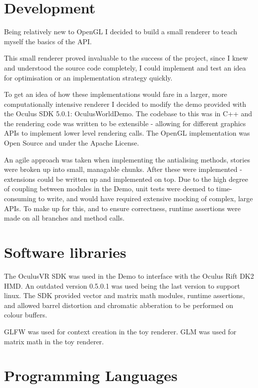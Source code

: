 \documentclass[12pt,a4paper,twoside,openright]{report}
\begin{document}
\section{Development}

Being relatively new to OpenGL I decided to build a small renderer to teach myself the basics of the API.

This small renderer proved invaluable to the success of the project, since I knew and understood the source code completely, I could implement and test an idea for optimisation or an implementation strategy quickly.

To get an idea of how these implementations would fare in a larger, more computationally intensive renderer I decided to modify the demo provided with the Oculus SDK 5.0.1: OculusWorldDemo.
The codebase to this was in C++ and the rendering code was written to be extensible - allowing for different graphics APIs to implement lower level rendering calls. The OpenGL implementation was Open Source and under the Apache License.

An agile approach was taken when implementing the antialising methods, stories were broken up into small, managable chunks. After these were implemented - extensions could be written up and implemented on top.
Due to the high degree of coupling between modules in the Demo, unit tests were deemed to time-consuming to write, and would have required extensive mocking of complex, large APIs.
To make up for this, and to ensure correctness, runtime assertions were made on all branches and method calls.

\section{Software libraries}

The OculusVR SDK was used in the Demo to interface with the Oculus Rift DK2 HMD. An outdated version 0.5.0.1 was used being the last version to support linux.
The SDK provided vector and matrix math modules, runtime assertions, and allowed barrel distortion and chromatic abberation to be performed on colour buffers.

GLFW was used for context creation in the toy renderer.
GLM was used for matrix math in the toy renderer.

\section{Programming Languages}
\end{document}

